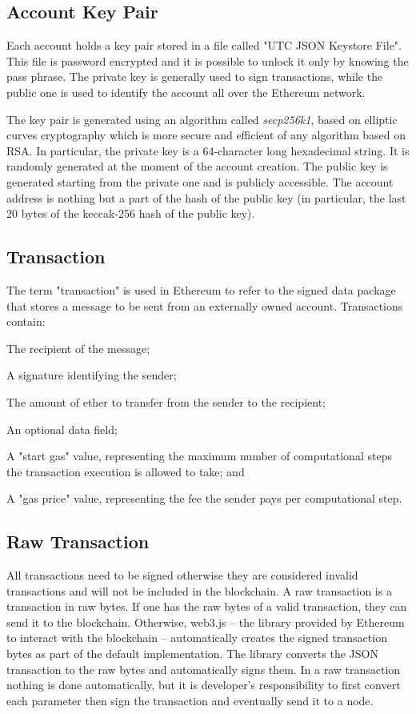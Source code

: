 \subsection*{Account Key Pair}
Each account holds a key pair stored in a file called "UTC JSON Keystore File". This file is password encrypted and it is possible to unlock it only by knowing the pass phrase. The private key is generally used to sign transactions, while the public one is used to identify the account all over the Ethereum network.

The key pair is generated using an algorithm called \textit{secp256k1}, based on elliptic curves cryptography which is more secure and efficient of any algorithm based on RSA. In particular, the private key is a 64-character long hexadecimal string. It is randomly generated at the moment of the account creation. The public key is generated starting from the private one and is publicly accessible. The account address is nothing but a part of the hash of the public key (in particular, the last 20 bytes of the keccak-256 hash of the public key).

\subsection*{Transaction}
The term "transaction" is used in Ethereum to refer to the signed data package that stores a message to be sent from an externally owned account. Transactions contain:
\begin{list}{}
\item The recipient of the message;
\item A signature identifying the sender;
\item The amount of ether to transfer from the sender to the recipient;
\item An optional data field;
\item A "start gas" value, representing the maximum number of computational steps the transaction execution is allowed to take; and
\item A "gas price" value, representing the fee the sender pays per computational step.
\end{list}

\subsection*{Raw Transaction}
All transactions need to be signed otherwise they are considered invalid transactions and will not be included in the blockchain. A raw transaction is a transaction in raw bytes. If one has the raw bytes of a valid transaction, they can send it to the blockchain. Otherwise, web3.js -- the library provided by Ethereum to interact with the blockchain -- automatically creates the signed transaction bytes as part of the default implementation. The library converts the JSON transaction to the raw bytes and automatically signs them. In a raw transaction nothing is done automatically, but it is developer's responsibility to first convert each parameter then sign the transaction and eventually send it to a node.

